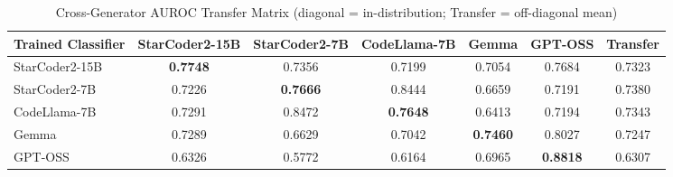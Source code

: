 \begin{table}[htbp]
\centering
\caption{Cross-Generator AUROC Transfer Matrix (diagonal = in-distribution; Transfer = off-diagonal mean)}
\label{tab:cross_generator_auroc}
\begin{tabular}{l|ccccc|c}
\hline
\textbf{Trained Classifier} & \textbf{StarCoder2-15B} & \textbf{StarCoder2-7B} & \textbf{CodeLlama-7B} & \textbf{Gemma} & \textbf{GPT-OSS} & \textbf{Transfer} \\ \hline
StarCoder2-15B   & \textbf{0.7748} & 0.7356 & 0.7199 & 0.7054 & 0.7684 & 0.7323 \\
StarCoder2-7B    & 0.7226 & \textbf{0.7666} & 0.8444 & 0.6659 & 0.7191 & 0.7380 \\
CodeLlama-7B     & 0.7291 & 0.8472 & \textbf{0.7648} & 0.6413 & 0.7194 & 0.7343 \\
Gemma            & 0.7289 & 0.6629 & 0.7042 & \textbf{0.7460} & 0.8027 & 0.7247 \\
GPT-OSS          & 0.6326 & 0.5772 & 0.6164 & 0.6965 & \textbf{0.8818} & 0.6307 \\
\hline
\end{tabular}
\end{table}
